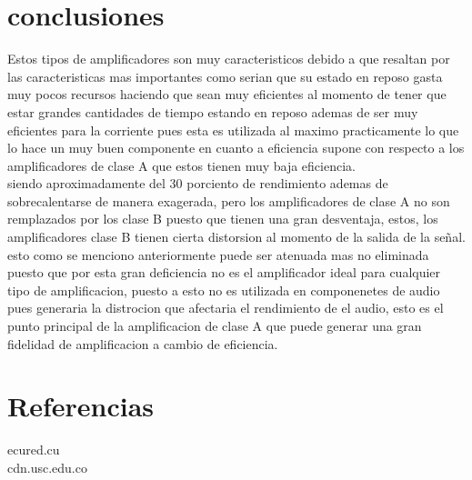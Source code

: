 \documentclass[13pt]{article}
\begin{document}
\section{conclusiones}
Estos tipos de amplificadores son muy caracteristicos debido a que resaltan por las caracteristicas mas importantes como serian que su estado en reposo gasta muy pocos recursos haciendo que sean muy eficientes al momento de tener que estar grandes cantidades de tiempo estando en reposo ademas de ser muy eficientes para la corriente pues esta es utilizada al maximo practicamente lo que lo hace un muy buen componente en cuanto a eficiencia supone con respecto a los amplificadores de clase A que estos tienen muy baja eficiencia.\\ siendo aproximadamente del 30 porciento de rendimiento ademas de sobrecalentarse de manera exagerada, pero los amplificadores de clase A no son remplazados por los clase B puesto que tienen una gran desventaja, estos, los amplificadores clase B tienen cierta distorsion al momento de la salida de la señal.\\ esto como se menciono anteriormente puede ser atenuada mas no eliminada puesto que por esta gran deficiencia no es el amplificador ideal para cualquier tipo de amplificacion, puesto a esto no es utilizada en componenetes de audio pues generaria la distrocion que afectaria el rendimiento de el audio, esto es el punto principal de la amplificacion de clase A que puede generar una gran fidelidad de amplificacion a cambio de eficiencia. 
 
\section{Referencias}
ecured.cu\\
cdn.usc.edu.co 
\end{document}
